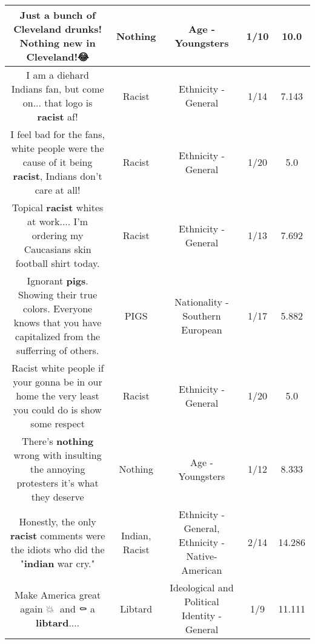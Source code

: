 \documentclass[11pt]{article}
\newlength\mylength
\begin{document}
\begin{center}
\begin{longtable}{|C{.65\mylength}|C{.30\mylength}|C{.12\mylength}|C{.12\mylength}|C{.12\mylength}|}
  \small Just a bunch of Cleveland drunks! \textbf{Nothing} new in Cleveland!😂\normalsize   & Nothing & Age - Youngsters & 1/10 & 10.0 \\  \hline
  \small I am a diehard Indians fan, but come on... that logo is \textbf{racist} af!\normalsize   & Racist & Ethnicity - General & 1/14 & 7.143 \\  \hline
  \small I feel bad for the fans, white people were the cause of it being \textbf{racist}, Indians don't care at all!\normalsize   & Racist & Ethnicity - General & 1/20 & 5.0 \\  \hline
  \small Topical \textbf{racist} whites at work.... I'm ordering my Caucasians skin football shirt today.\normalsize   & Racist & Ethnicity - General & 1/13 & 7.692 \\  \hline
  \small Ignorant \textbf{pigs}. Showing their true colors. Everyone knows that you have capitalized from the sufferring of others.\normalsize   & PIGS & Nationality - Southern European & 1/17 & 5.882 \\  \hline
  \small Racist white people if your gonna be in our home the very least you could do is show some respect\normalsize   & Racist & Ethnicity - General & 1/20 & 5.0 \\  \hline
  \small There's \textbf{nothing} wrong with insulting the annoying protesters it's what they deserve\normalsize   & Nothing & Age - Youngsters & 1/12 & 8.333 \\  \hline
  \small Honestly, the only \textbf{racist} comments were the idiots who did the "\textbf{indian} war cry."\normalsize   & Indian, Racist & Ethnicity - General, Ethnicity - Native-American & 2/14 & 14.286 \\  \hline
  \small Make America great again 💥🔫 and ⚰ a \textbf{libtard}....\normalsize   & Libtard &  Ideological and Political Identity - General & 1/9 & 11.111 \\  \hline

\end{longtable}
\end{center}
\end{document}
